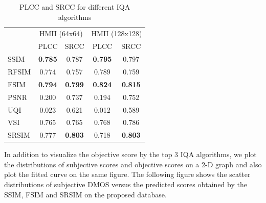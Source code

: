 \begin{table}[ht]
  \centering
  \begin{tabular}{|l|cc|cc|}
    \hline
    \multirow{2}{*}{} & \multicolumn{2}{c|}{ HMII (64x64) }      & \multicolumn{2}{c|}{ HMII (128x128) }    \\ \cline{2-5} 
    & PLCC           & SRCC           & PLCC           & SRCC           \\ \hline
    SSIM\cite{Wang2004}             & \textbf{0.785} & 0.787          & \textbf{0.795} & 0.797          \\
    RFSIM\cite{Zhang2010}             & 0.774          & 0.757          & 0.789          & 0.759          \\
    FSIM\cite{Zhang2011}              & \textbf{0.794} & \textbf{0.799} & \textbf{0.824} & \textbf{0.815} \\
    PSNR              & 0.200          & 0.737          & 0.194          & 0.752          \\
    UQI\cite{Wang2002}               & 0.023          & 0.621          & 0.012          & 0.589          \\
    VSI\cite{Zhang2014}               & 0.765          & 0.765          & 0.768          & 0.786          \\
    SRSIM\cite{Zhang2012}             & 0.777          & \textbf{0.803} & 0.718          & \textbf{0.803} \\ \hline
  \end{tabular}
  \caption{PLCC and SRCC for different IQA algorithms}
  \label{tab:algos}
\end{table}

In addition to visualize the objective score by the top 3 IQA algorithms, we plot the distributions of subjective scores and objective scores on a 2-D graph and also plot the fitted curve on the same figure. The following figure shows the scatter distributions of subjective DMOS versus the predicted scores obtained by the SSIM, FSIM and SRSIM on the proposed database.


